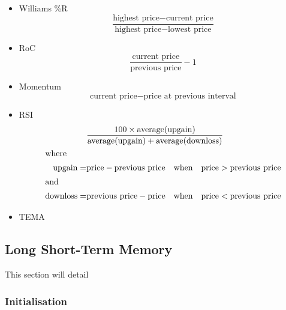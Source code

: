 \documentclass[12pt,a4paper,twoside,openright]{report}
\begin{document}
\begin{itemize}
\item
Williams \%R
\begin{equation}
\frac{\text{highest price} - \text{current price}}{\text{highest price} - \text{lowest price}}
\end{equation}

\item
RoC
\begin{equation}
\frac{\text{current price}}{\text{previous price}} - 1
\end{equation}

\item
Momentum
\begin{equation}
\text{current price} - \text{price at previous interval}
\end{equation}

\item
RSI
\begin{align}
\begin{split}
&\frac{100 \times \text{average}(\text{upgain})}{\text{average}(\text{upgain}) + \text{average}(\text{downloss})}\\
\intertext{where}
\text{upgain} = &\text{price} - \text{previous price} \quad \text{when} \quad \text{price} > \text{previous price}\\
\intertext{and}
\text{downloss} = &\text{previous price} - \text{price} \quad \text{when} \quad \text{price} < \text{previous price}
\end{split}
\end{align}

\item
TEMA


\end{itemize}

\subsection{Long Short-Term Memory}
\label{sec:ImplLSTM}

This section will detail


\subsubsection{Initialisation}
\end{document}
